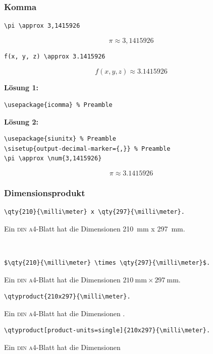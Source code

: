 \documentclass[handout]{beamer}
\begin{document}
\begin{frame}[fragile]
    \frametitle{Komma}
    \begin{wrong}
        \begin{lstlisting}
\pi \approx 3,1415926
        \end{lstlisting}
        \begin{equation*}
            \pi \approx 3,1415926
        \end{equation*}
    \end{wrong}
    \pause
    \begin{lstlisting}
f(x, y, z) \approx 3.1415926
    \end{lstlisting}
    \begin{equation*}
        f(x,y,z) \approx 3.1415926
    \end{equation*}

    \pause

    \textbf{Lösung 1:}
    \begin{lstlisting}
\usepackage{icomma} % Preamble
    \end{lstlisting}

    \pause

    \textbf{Lösung 2:}
    \begin{lstlisting}
\usepackage{siunitx} % Preamble
\sisetup{output-decimal-marker={,}} % Preamble
\pi \approx \num{3,1415926}
    \end{lstlisting}
    \begin{equation*}
        \pi \approx \num[output-decimal-marker={,}]{3,1415926}
    \end{equation*}
\end{frame}

\begin{frame}[fragile]
    \frametitle{Dimensionsprodukt}
    \begin{wrong}
        \begin{lstlisting}
\qty{210}{\milli\meter} x \qty{297}{\milli\meter}.
        \end{lstlisting}
        Ein \textsc{din a4}-Blatt hat die Dimensionen \qty{210}{\milli\meter} x \qty{297}{\milli\meter}.
    \end{wrong}\\[2ex]
    \pause

    \begin{lstlisting}
$\qty{210}{\milli\meter} \times \qty{297}{\milli\meter}$.
    \end{lstlisting}
    Ein \textsc{din a4}-Blatt hat die Dimensionen $\qty{210}{\milli\meter} \times \qty{297}{\milli\meter}$.\\[2ex]
    \pause

    \begin{lstlisting}
\qtyproduct{210x297}{\milli\meter}.
    \end{lstlisting}
    Ein \textsc{din a4}-Blatt hat die Dimensionen .

    \begin{lstlisting}
\qtyproduct[product-units=single]{210x297}{\milli\meter}.
    \end{lstlisting}
    Ein \textsc{din a4}-Blatt hat die Dimensionen 
\end{frame}
\end{document}

